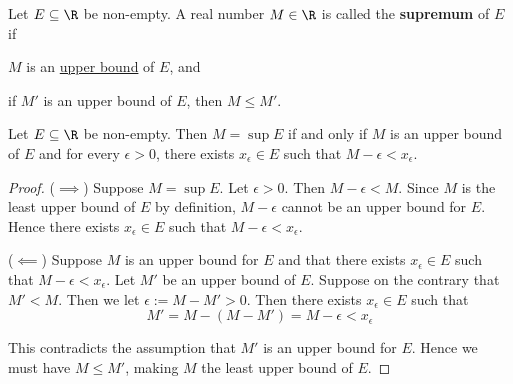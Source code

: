 \label{e6981e1}

Let $E\subseteq\R$ be non-empty. A real number $M\in\R$ is called the
\textbf{supremum} of $E$ if
\begin{enumerati}
  \item $M$ is an \href{e4698be}{upper bound} of $E$, and
  \item if $M'$ is an upper bound of $E$, then $M\leq M'$.
\end{enumerati}

\label{f77f162}

Let $E\subseteq\R$ be non-empty. Then $M=\sup E$ if and only if $M$ is an upper
bound of $E$ and for every $\epsilon>0$, there exists $x_\epsilon\in E$ such
that $M-\epsilon<x_\epsilon$.

\begin{proof}
  ($\implies$) Suppose $M=\sup E$. Let $\epsilon>0$. Then $M-\epsilon<M$. Since
  $M$ is the least upper bound of $E$ by definition, $M-\epsilon$ cannot be an
  upper bound for $E$. Hence there exists $x_\epsilon\in E$ such that
  $M-\epsilon<x_\epsilon$.

  ($\impliedby$) Suppose $M$ is an upper bound for $E$ and that there exists
  $x_\epsilon\in E$ such that $M-\epsilon<x_\epsilon$. Let $M'$ be an upper
  bound of $E$. Suppose on the contrary that $M'<M$. Then we let
  $\epsilon:=M-M'>0$. Then there exists $x_\epsilon\in E$ such that
  $$
    M'=M-(M-M')=M-\epsilon<x_\epsilon
  $$

  This contradicts the assumption that $M'$ is an upper bound for $E$. Hence we
  must have $M\leq M'$, making $M$ the least upper bound of $E$.
\end{proof}
